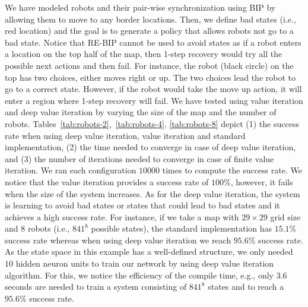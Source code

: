 We have modeled robots and their pair-wise synchronization using BIP by allowing them to move to any border locations. Then, we define bad states (i.e., red location) and the goal is to generate a policy that allows robots not go to a bad state. Notice that RE-BIP cannot be used to avoid states as if a robot enters a location on the top half of the map, then 1-step recovery would try all the possible next actions and then fail. For instance, the robot (black circle) on the top has two choices, either moves right or up. The two choices lead the robot to go to a correct state. However, if the robot would take the move up action, it will enter a region where 1-step recovery will fail. 
%
We have tested \rerl using value iteration and deep value iteration by varying the size of the map and the number of robots. Tables~\ref{tab:robots-2},~\ref{tab:robots-4}, \ref{tab:robots-8} depict (1) the success rate when using deep value iteration, value iteration and standard implementation, (2) the time needed to converge in case of deep value iteration, and (3) the number of iterations needed to converge in case of finite value iteration. We ran each configuration $10000$ times to compute the success rate. 
We notice that the value iteration provides a success rate of $100\%$, however, it fails when the size of the system increases. As for the deep value iteration, the system is learning to avoid bad states or states that could lead to bad states and it achieves a high success rate. For instance, if we take a map with $29\times29$ grid size and $8$ robots (i.e., $841^8$ possible states), the standard implementation has $15.1\%$ success rate whereas when using deep value iteration we reach $95.6\%$ success rate. As the state space in this example has a well-defined structure, we only needed $10$ hidden neuron units to train our network by using  deep value iteration algorithm. For this, we notice the efficiency of the compile time, e.g., only $3.6$ seconds are needed to train a system consisting of  $841^8$ states and to reach a $95.6\%$ success rate. 

